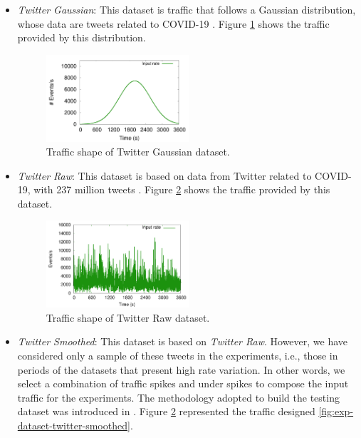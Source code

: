 \begin{itemize}
\item \textit{Twitter Gaussian}: This dataset is traffic that follows a Gaussian distribution, whose data are tweets related to COVID-19 \cite{PXF2CU2020}. Figure \ref{fig:exp-dataset-twitter-gaussian} shows the traffic provided by this distribution.

\begin{figure}[!ht]
\centering
    \includegraphics[width=0.5\textwidth]{figures/exp/Dataset-TwitterGaussian.pdf}
    \caption{Traffic shape of Twitter Gaussian dataset.}
    \label{fig:exp-dataset-twitter-gaussian}
\end{figure}

\item \textit{Twitter Raw}: This dataset is based on data from Twitter related to COVID-19, with 237 million tweets \cite{PXF2CU2020}. Figure \ref{fig:exp-dataset-twitter-raw} shows the traffic provided by this dataset.

\begin{figure}[!ht]
\centering
    \includegraphics[width=0.5\textwidth]{figures/exp/Dataset-TwitterRaw.pdf}
    \caption{Traffic shape of Twitter Raw dataset.}
    \label{fig:exp-dataset-twitter-raw}
\end{figure}

\item \textit{Twitter Smoothed}: This dataset is based on \textit{Twitter Raw}. However, we have considered only a sample of these tweets in the experiments, i.e., those in periods of the datasets that present high rate variation. In other words, we select a combination of traffic spikes and under spikes to compose the input traffic for the experiments. The methodology adopted to build the testing dataset was introduced in \cite{BodikFFJP10}. Figure \ref{fig:exp-dataset-twitter-raw} represented the traffic designed \ref{fig:exp-dataset-twitter-smoothed}.


\end{itemize}
